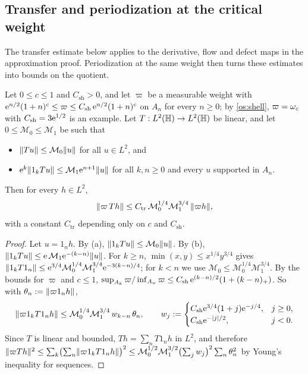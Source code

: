 \subsection{Transfer and periodization at the critical weight}\label{subsec:pc-transfer}
The transfer estimate below applies to the derivative, flow and defect maps in the approximation proof.
Periodization at the same weight then turns these estimates into bounds on the quotient.

\begin{lemma}\label{os:transfer}
Let $0\le c\le1$ and $C_{\mathrm{sh}}>0$, and let $\varpi$ be a measurable weight with $\mathrm{e}^{n/2}(1+n)^c\le\varpi\le C_{\mathrm{sh}}\,\mathrm{e}^{n/2}(1+n)^c$ on $A_n$ for
every $n\ge0$; by \eqref{os:shell}, $\varpi=\omega_c$ with $C_{\mathrm{sh}}=3\mathrm{e}^{1/2}$ is an example. Let $T:L^2(\mathbb{H})\to L^2(\mathbb{H})$ be linear, and let
$0\le\mathcal M_0\le \mathcal M_1$ be such that
\begin{itemize}
\item[(a)] $\lVert Tu\rVert\le \mathcal M_0\lVert u\rVert$ for all $u\in L^2$, and
\item[(b)] $\mathrm{e}^k\lVert 1_kTu\rVert\le\mathcal M_1\mathrm{e}^{n+1}\lVert u\rVert$ for all $k,n\ge0$ and every $u$ supported in $A_n$.
\end{itemize}
Then for every $h\in L^2$,
\[
\lVert \varpi\,Th\rVert\le C_{\mathrm{tr}}\,\mathcal M_0^{1/4}\mathcal M_1^{3/4}\,\lVert \varpi h\rVert,
\]
with a constant $C_{\mathrm{tr}}$ depending only on $c$ and $C_{\mathrm{sh}}$.
\end{lemma}
\begin{proof}
Let $u=1_nh$. By (a), $\lVert 1_kTu\rVert\le \mathcal M_0\lVert u\rVert$. By (b),
$\lVert 1_kTu\rVert\le\mathrm{e}\,\mathcal M_1\mathrm{e}^{-(k-n)}\lVert u\rVert$. For $k\ge n$, $\min(x,y)\le x^{1/4}y^{3/4}$ gives
$\lVert 1_kT1_n\rVert\le\mathrm{e}^{3/4}\mathcal M_0^{1/4}\mathcal M_1^{3/4}\mathrm{e}^{-3(k-n)/4}$; for $k<n$ we use $\mathcal M_0\le \mathcal M_0^{1/4}\mathcal M_1^{3/4}$. By the bounds for $\varpi$ and $c\le1$,
$\sup_{A_k}\varpi/\inf_{A_n}\varpi\le C_{\mathrm{sh}}\,\mathrm{e}^{(k-n)/2}(1+(k-n)_+)$. So with $\theta_n:=\lVert \varpi1_nh\rVert$,
\[
\lVert \varpi1_kT1_nh\rVert\le \mathcal M_0^{1/4}\mathcal M_1^{3/4}\,w_{k-n}\,\theta_n,\qquad w_j:=\begin{cases}C_{\mathrm{sh}}\mathrm{e}^{3/4}(1+j)\mathrm{e}^{-j/4},&j\ge0,\\C_{\mathrm{sh}}\mathrm{e}^{-|j|/2},&j<0.\end{cases}
\]
Since $T$ is linear and bounded, $Th=\sum_nT1_nh$ in $L^2$, and therefore
$\lVert \varpi Th\rVert^2\le\sum_k\bigl(\sum_n\lVert \varpi1_kT1_nh\rVert\bigr)^2\le \mathcal M_0^{1/2}\mathcal M_1^{3/2}\bigl(\sum_jw_j\bigr)^2\sum_n\theta_n^2$ by Young's inequality for
sequences.
\end{proof}

